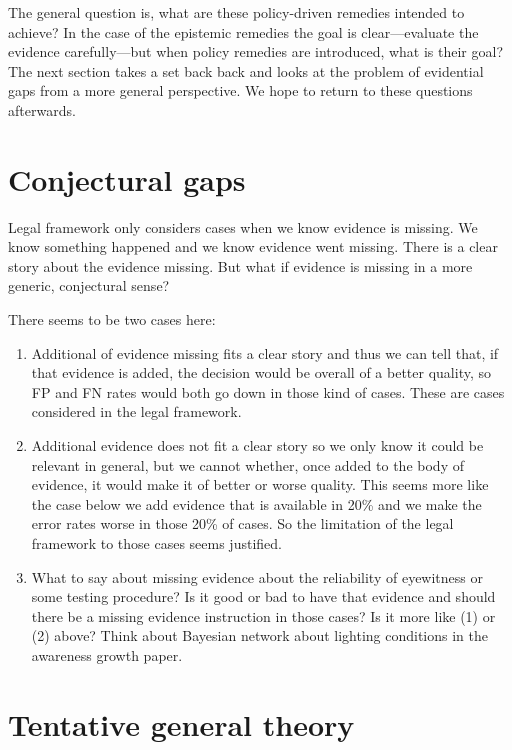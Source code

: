 \documentclass[
  10pt,
  dvipsnames,enabledeprecatedfontcommands]{scrartcl}
\begin{document}
The general question is, what are these policy-driven remedies intended
to achieve? In the case of the epistemic remedies the goal is
clear---evaluate the evidence carefully---but when policy remedies are
introduced, what is their goal? The next section takes a set back back
and looks at the problem of evidential gaps from a more general
perspective. We hope to return to these questions afterwards.

\hypertarget{conjectural-gaps}{%
\section{Conjectural gaps}\label{conjectural-gaps}}

Legal framework only considers cases when we know evidence is missing.
We know something happened and we know evidence went missing. There is a
clear story about the evidence missing. But what if evidence is missing
in a more generic, conjectural sense?

There seems to be two cases here:

\begin{enumerate}
\def\labelenumi{(\arabic{enumi})}
\item
  Additional of evidence missing fits a clear story and thus we can tell
  that, if that evidence is added, the decision would be overall of a
  better quality, so FP and FN rates would both go down in those kind of
  cases. These are cases considered in the legal framework.
\item
  Additional evidence does not fit a clear story so we only know it
  could be relevant in general, but we cannot whether, once added to the
  body of evidence, it would make it of better or worse quality. This
  seems more like the case below we add evidence that is available in
  20\% and we make the error rates worse in those 20\% of cases. So the
  limitation of the legal framework to those cases seems justified.
\item
  What to say about missing evidence about the reliability of eyewitness
  or some testing procedure? Is it good or bad to have that evidence and
  should there be a missing evidence instruction in those cases? Is it
  more like (1) or (2) above? Think about Bayesian network about
  lighting conditions in the awareness growth paper.
\end{enumerate}

\hypertarget{tentative-general-theory}{%
\section{Tentative general theory}\label{tentative-general-theory}}
\end{document}

